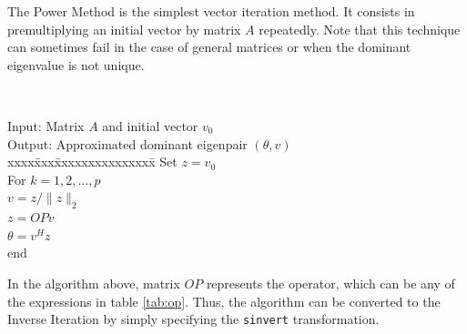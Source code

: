 The Power Method is the simplest vector iteration method. It consists in premultiplying an initial vector by matrix $A$ repeatedly. 
Note that this technique can sometimes fail in the case of general matrices or when the dominant eigenvalue is not unique.

\begin{algorithm}~\rm
\begin{tabbing}
Input: Matrix $A$ and initial vector $v_0$\\
Output: Approximated dominant eigenpair $(\theta,v)$ \\
xxxx\=xxx\=xxxxxxxxxxxxxxx\=\kill
\> Set $z=v_0$\\
\> For $k=1,2,\ldots,p$\\
\> \> $v=z/\|z\|_2$ \\
\> \> $z=O\!Pv$ \\
\> \> $\theta=v^Hz$ \\
\> end
\end{tabbing}
\end{algorithm}
In the algorithm above, matrix $O\!P$ represents the operator, which can be any of the expressions in table \ref{tab:op}. Thus, the algorithm can be converted to the Inverse Iteration by simply specifying the \texttt{sinvert} transformation.

